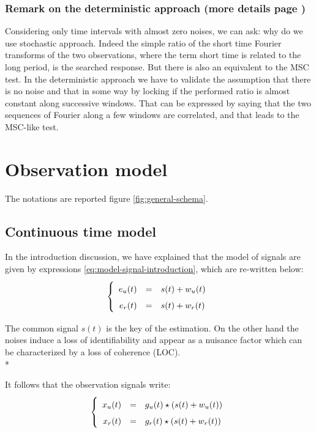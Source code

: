 \subsubsection{Remark on the deterministic approach (more details page \pageref{ann:deterministic-approach})}
Considering only time intervals with almost zero noises, we can ask: why do we use stochastic approach. Indeed the simple ratio of the short time Fourier transforms of the two observations, where the term short time is related to the long period, is the searched response. But there is also an equivalent to the MSC test. In the deterministic approach we have to validate the assumption that there is no noise and that in some way by locking if the performed ratio is almost constant along successive windows. That can be expressed by saying that the two sequences of Fourier along a few windows are correlated, and that leads to the MSC-like test.


\section{Observation model}
The notations are reported figure \ref{fig:general-schema}.  
\subsection{Continuous time model}

In the introduction discussion, we have explained that the model of signals are given by expressions \eqref{eq:model-signal-introduction}, which are re-written below:
\begin{eqnarray}
\label{eq:model-of-excitation}
\left\{
\renewcommand\arraystretch{1.6}
\begin{array}{rcl}
e_{\ut}(t)&=&s(t)+w_{\ut}(t)
\\
e_{\rf}(t)&=&s(t)+w_{\rf}(t)
\end{array}
\right.
\end{eqnarray}


The common signal $s(t)$ is the key of the estimation. On the other hand the noises induce a loss of identifiability and appear as a nuisance factor which can be characterized by a loss of coherence (LOC). \\*


It follows that the observation signals write:
\begin{eqnarray}
\label{eq:model-of-obervation}
\left\{
\renewcommand\arraystretch{1.6}
\begin{array}{rcl}
x_{\ut}(t)&=&g_{\ut} (t)\star(s(t)+w_{\ut}(t))
\\
x_{\rf}(t)&=&g_{\rf}(t) \star (s(t)+w_{\rf}(t))
\end{array}
\right.
\end{eqnarray}


